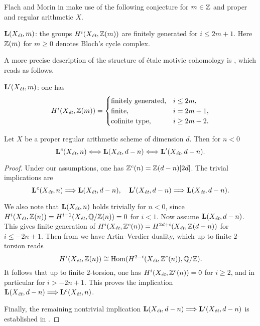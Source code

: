 \documentclass{article}
\numberwithin{equation}{section}
\begin{document}
Flach and Morin in \cite{Flach-Morin-2018} make use of the following conjecture
for $m \in \ZZ$ and proper and regular arithmetic $X$.

\begin{conjecture}
  $\mathbf{L} (X_\et, m)$: the groups $H^i (X_\et, \ZZ (m))$ are finitely
  generated for $i \le 2m+1$. Here $\ZZ (m)$ for $m \ge 0$ denotes Bloch's cycle
  complex.
\end{conjecture}

A more precise description of the structure of étale motivic cohomology is
\cite[Conjecture~4.12]{Geisser-2017}, which reads as follows.

\begin{conjecture}
  $\mathbf{L}' (X_\et, m)$: one has
  \[ H^i (X_\et, \ZZ (m)) = \begin{cases}
      \text{finitely generated}, & i \le 2m, \\
      \text{finite}, & i = 2m + 1, \\
      \text{cofinite type}, & i \ge 2m + 2.
    \end{cases} \]
\end{conjecture}

\begin{proposition}
  \label{prop:Lc-Xet-n-vs-L-Xet-d-n}
  Let $X$ be a proper regular arithmetic scheme of dimension $d$.
  Then for $n < 0$
  \[ \mathbf{L}^c (X_\et, n) \Longleftrightarrow
    \mathbf{L} (X_\et, d-n) \Longleftrightarrow
    \mathbf{L}' (X_\et, d-n). \]

  \begin{proof}
    Under our assumptions, one has $\ZZ^c (n) = \ZZ (d-n) [2d]$. The trivial
    implications are
    \[ \mathbf{L}^c (X_\et, n) \Longrightarrow \mathbf{L} (X_\et, d-n), \quad
      \mathbf{L}' (X_\et, d-n) \Longrightarrow \mathbf{L} (X_\et, d-n). \]

    We also note that $\mathbf{L} (X_\et, n)$ holds trivially for $n < 0$, since
    $H^i (X_\et, \ZZ (n)) = H^{i-1} (X_\et, \QQ/\ZZ (n)) = 0$ for $i < 1$.
    Now assume $\mathbf{L} (X_\et, d-n)$. This gives finite generation of
    $H^i (X_\et, \ZZ^c (n)) = H^{2d+i} (X_\et, \ZZ (d-n))$ for $i \le -2n + 1$.
    Then from \cite[Proposition~3.4]{Flach-Morin-2018} we have Artin--Verdier
    duality, which up to finite $2$-torsion reads
    $$H^i (X_\et, \ZZ (n)) \cong \Hom (H^{2-i} (X_\et, \ZZ^c (n)), \QQ/\ZZ).$$
    It follows that up to finite $2$-torsion, one has
    $H^i (X_\et, \ZZ^c (n)) = 0$ for $i \ge 2$, and in particular for
    $i > -2n + 1$. This proves the implication
    $\mathbf{L} (X_\et, d-n) \Longrightarrow \mathbf{L}^c (X_\et, n)$.

    Finally, the remaining nontrivial implication
    $\mathbf{L} (X_\et, d-n) \Longrightarrow \mathbf{L}' (X_\et, d-n)$ is
    established in \cite[Proposition~3.4]{Flach-Morin-2018}.
  \end{proof}
\end{proposition}
\end{document}
